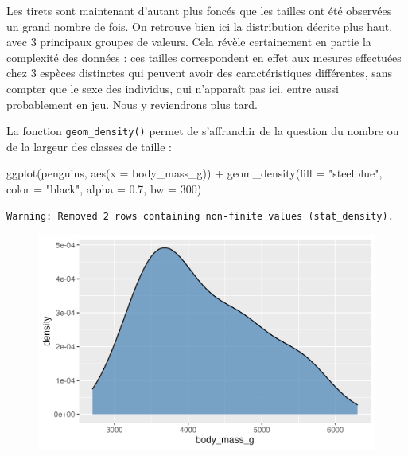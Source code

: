 \documentclass[
  letterpaper,
  DIV=11,
  numbers=noendperiod]{scrreprt}
\newenvironment{Shaded}{\begin{snugshade}}{\end{snugshade}}
\newcommand{\AttributeTok}[1]{\textcolor[rgb]{0.40,0.45,0.13}{#1}}
\newcommand{\DecValTok}[1]{\textcolor[rgb]{0.68,0.00,0.00}{#1}}
\newcommand{\FloatTok}[1]{\textcolor[rgb]{0.68,0.00,0.00}{#1}}
\newcommand{\FunctionTok}[1]{\textcolor[rgb]{0.28,0.35,0.67}{#1}}
\newcommand{\NormalTok}[1]{\textcolor[rgb]{0.00,0.23,0.31}{#1}}
\newcommand{\SpecialCharTok}[1]{\textcolor[rgb]{0.37,0.37,0.37}{#1}}
\newcommand{\StringTok}[1]{\textcolor[rgb]{0.13,0.47,0.30}{#1}}
\begin{document}
Les tirets sont maintenant d'autant plus foncés que les tailles ont été
observées un grand nombre de fois. On retrouve bien ici la distribution
décrite plus haut, avec 3 principaux groupes de valeurs. Cela révèle
certainement en partie la complexité des données : ces tailles
correspondent en effet aux mesures effectuées chez 3 espèces distinctes
qui peuvent avoir des caractéristiques différentes, sans compter que le
sexe des individus, qui n'apparaît pas ici, entre aussi probablement en
jeu. Nous y reviendrons plus tard.

La fonction \texttt{geom\_density()} permet de s'affranchir de la
question du nombre ou de la largeur des classes de taille :

\begin{Shaded}
\begin{Highlighting}[]
\FunctionTok{ggplot}\NormalTok{(penguins, }\FunctionTok{aes}\NormalTok{(}\AttributeTok{x =}\NormalTok{ body\_mass\_g)) }\SpecialCharTok{+}
  \FunctionTok{geom\_density}\NormalTok{(}\AttributeTok{fill =} \StringTok{"steelblue"}\NormalTok{, }\AttributeTok{color =} \StringTok{"black"}\NormalTok{, }\AttributeTok{alpha =} \FloatTok{0.7}\NormalTok{, }\AttributeTok{bw =} \DecValTok{300}\NormalTok{)}
\end{Highlighting}
\end{Shaded}

\begin{verbatim}
Warning: Removed 2 rows containing non-finite values (stat_density).
\end{verbatim}

\begin{figure}[H]

{\centering \includegraphics{./03-visualization_files/figure-pdf/unnamed-chunk-22-1.png}

}

\end{figure}
\end{document}
